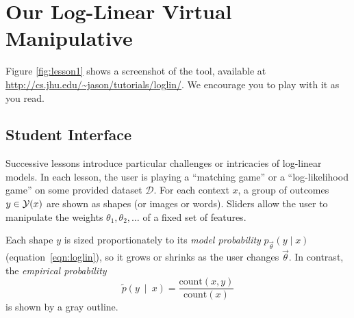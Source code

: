 \documentclass[11pt,letterpaper]{article}
\newcommand{\Note}[1]{}
\renewcommand{\Note}[1]{\hl{[#1]}}  %
\newcommand{\NoteSigned}[3]{{\sethlcolor{#2}\Note{#1: #3}}}
\newcommand{\NoteJE}[1]{\NoteSigned{JE}{LightGreen}{#1}}
\newcommand{\Commented}[1]{#1}
\newcommand{\empirical}[0]{\ensuremath{\tilde{p}}}
\newcommand{\Data}[0]{\ensuremath{\mathcal{D}}}
\newcommand{\WhereToFind}[0]{\url{http://cs.jhu.edu/~jason/tutorials/loglin/}}
\begin{document}

\section{Our Log-Linear Virtual Manipulative}\label{sec:overview}

Figure \ref{fig:lesson1} shows a screenshot
of the tool, available at 
\WhereToFind{}. We encourage you to play with it as you read.



\subsection{Student Interface}

Successive lessons introduce particular challenges or intricacies of
log-linear models.  In each lesson, the user is playing a ``matching
game'' or a ``log-likelihood game'' on some provided dataset \Data{}.
For each context $x$, a group of outcomes $y \in {\cal Y}(x)$ are
shown as shapes (or images or words).  Sliders allow the user to
manipulate the weights $\theta_1, \theta_2, \ldots$ of a fixed set of
features.  


Each shape $y$ is sized proportionately to its {\em model
probability} $p_{\vec{\theta}}(y \mid x)$ (equation~\eqref{eqn:loglin}), so it grows or shrinks as the user changes
$\vec{\theta}$.  
In contrast, the {\em empirical probability} 
\begin{equation}
\empirical\left(y\ \mid\ x\right) = \frac{\text{count}(x,y)}{\text{count}(x)} 
\label{eqn:empirical_distr}
\end{equation} 
is shown by a gray outline.
\end{document}
